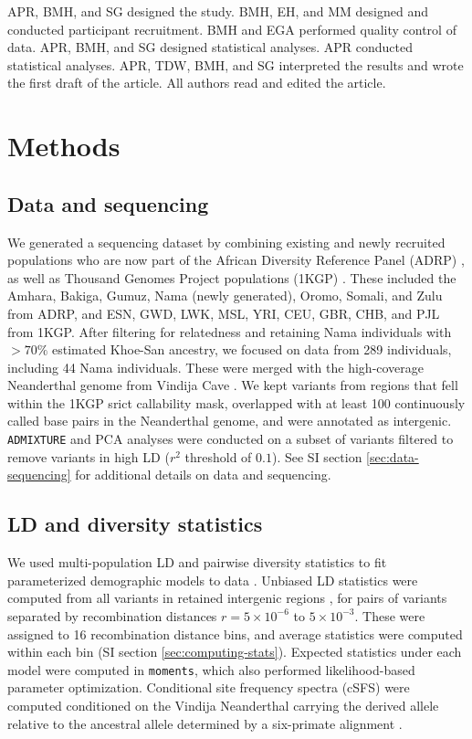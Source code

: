 \documentclass[]{article}
\begin{document}
{APR, BMH, and SG designed the study.
BMH, EH, and MM designed and conducted participant recruitment.
BMH and EGA performed quality control of data.
APR, BMH, and SG designed statistical analyses.
APR conducted statistical analyses. 
APR, TDW, BMH, and SG interpreted the results and wrote the first draft of the article. 
All authors read and edited the article.

\section*{Methods}

\subsection*{Data and sequencing}

We generated a sequencing dataset by combining existing and newly recruited
populations who are now part of the African Diversity Reference Panel (ADRP)
\citep{Gurdasani2015-qy,Pagani2015-pz}, as well as Thousand Genomes Project
populations (1KGP) \citep{1000_Genomes_Project_Consortium2015-zq}. These
included the Amhara, Bakiga, Gumuz, Nama (newly generated), Oromo, Somali, and
Zulu from ADRP, and ESN, GWD, LWK, MSL, YRI, CEU, GBR, CHB, and PJL from 1KGP.
After filtering for relatedness and retaining Nama individuals with $>70\%$
estimated Khoe-San ancestry, we focused on data from 289 individuals, including
44 Nama individuals. These were merged with the high-coverage Neanderthal
genome from Vindija Cave \citep{Prufer2017-kk}. We kept variants from regions
that fell within the 1KGP srict callability mask, overlapped with at least 100
continuously called base pairs in the Neanderthal genome, and were annotated as
intergenic. \texttt{ADMIXTURE} and PCA analyses were conducted on a subset of
variants filtered to remove variants in high LD ($r^2$ threshold of $0.1$). See
SI section \ref{sec:data-sequencing} for additional details on data and
sequencing.

\subsection*{LD and diversity statistics}

We used multi-population LD and pairwise diversity statistics to fit
parameterized demographic models to data \citep{Ragsdale2019-nt}. Unbiased LD
statistics were computed from all variants in retained intergenic regions
\citep{Ragsdale2020-nz}, for pairs of variants separated by recombination
distances $r = 5\times10^{-6}$ to $5\times10^{-3}$. These were assigned to 16
recombination distance bins, and average statistics were computed within each
bin (SI section \ref{sec:computing-stats}). Expected statistics under each model were computed
in \texttt{moments}, which also performed likelihood-based parameter
optimization. Conditional site frequency spectra (cSFS) were computed
conditioned on the Vindija Neanderthal carrying the derived allele relative to
the ancestral allele determined by a six-primate alignment
\citep{1000_Genomes_Project_Consortium2015-zq}.

}
\end{document}
